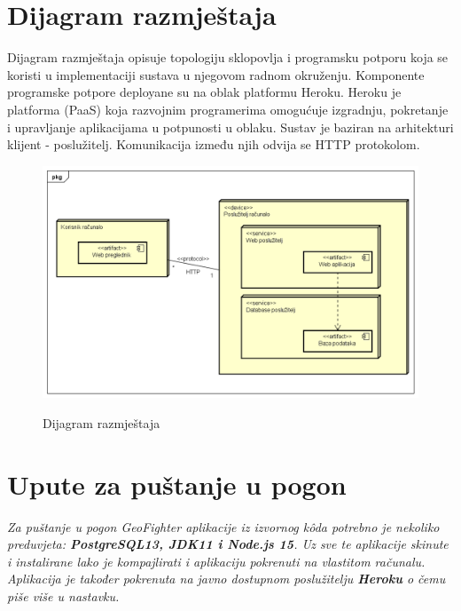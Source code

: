 		    \eject
		
		
		\section{Dijagram razmještaja}
			
			 \textnormal{Dijagram razmještaja opisuje topologiju sklopovlja i programsku potporu koja se koristi u implementaciji sustava u njegovom radnom okruženju. Komponente programske potpore deployane su na oblak platformu Heroku. Heroku je platforma (PaaS) koja razvojnim programerima omogućuje izgradnju, pokretanje i upravljanje aplikacijama u potpunosti u oblaku. Sustav je baziran na arhitekturi klijent - poslužitelj. Komunikacija između njih odvija se HTTP protokolom.}
			
			
			\begin{figure}[H]
				\centering
				\includegraphics[scale=0.58]{dijagrami/Deployment Diagram0} \\
				\caption{Dijagram razmještaja}
				\label{fig:UC8_sekvencijski}
			\end{figure}
		
			\eject
		
		\section{Upute za puštanje u pogon}
		
			\textit{Za puštanje u pogon GeoFighter aplikacije iz izvornog kôda potrebno je nekoliko preduvjeta: \textbf{PostgreSQL13, JDK11 i Node.js 15}. Uz sve te aplikacije skinute i instalirane lako je kompajlirati i aplikaciju pokrenuti na vlastitom računalu. Aplikacija je također pokrenuta na javno dostupnom poslužitelju \textbf{Heroku} o čemu piše više u nastavku.\\}
			
